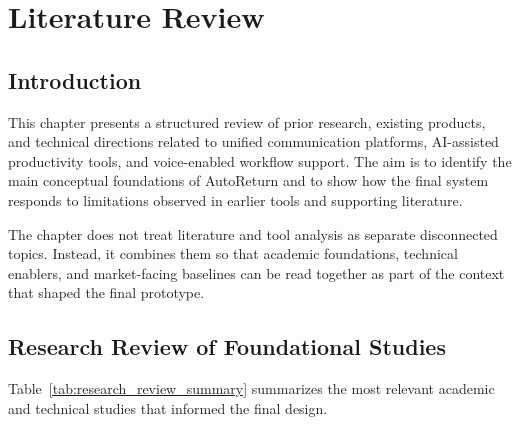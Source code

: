 \chapter{Literature Review}
\label{sec:literature_review}

\section{Introduction}
This chapter presents a structured review of prior research, existing products, and technical directions related to unified communication platforms, AI-assisted productivity tools, and voice-enabled workflow support. The aim is to identify the main conceptual foundations of AutoReturn and to show how the final system responds to limitations observed in earlier tools and supporting literature.

The chapter does not treat literature and tool analysis as separate disconnected topics. Instead, it combines them so that academic foundations, technical enablers, and market-facing baselines can be read together as part of the context that shaped the final prototype.

\section{Research Review of Foundational Studies}
Table~\ref{tab:research_review_summary} summarizes the most relevant academic and technical studies that informed the final design.

